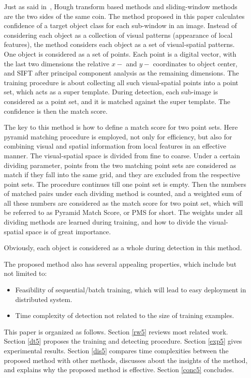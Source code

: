\documentclass[paper]{ieice}
\begin{document}
 Just as said in~\cite{ac27}, Hough transform based methods and sliding-window methods are the two sides of the same coin. The method proposed in this paper calculates confidence of a target object class for each sub-window in an image. Instead of considering each object as a collection of visual patterns (appearance of local features), the method considers each object as a set of visual-spatial patterns. One object is considered as a set of points. Each point is a digital vector, with the last two dimensions the relative $x-$ and $y-$ coordinates to object center, and SIFT after principal component analysis as the remaining dimensions. The training procedure is about collecting all such visual-spatial points into a point set, which acts as a super template. During detection, each sub-image is considered as a point set, and it is matched against the super template. The confidence is then the match score.

 The key to this method is how to define a match score for two point sets. Here pyramid matching procedure is employed, not only for efficiency, but also for combining visual and spatial information from local features in an effective manner. The visual-spatial space is divided from fine to coarse. Under a certain dividing parameter, points from the two matching point sets are considered as match if they fall into the same grid, and they are excluded from the respective point sets. The procedure continues till one point set is empty. Then the numbers of matched pairs under each dividing method is counted, and a weighted sum of all these numbers are considered as the match score for two point set, which will be referred to as Pyramid Match Score, or PMS for short. The weights under all dividing methods are learned during training, and how to divide the visual-spatial space is of great importance.

Obviously, each object is considered as a whole during detection in this method.

The proposed method also has several appealing properties, which include but not limited to:
\begin{itemize}
\item {Feasibility of sequential/batch training, which will lead to easy deployment in distributed system.}
\item {Time complexity of detection not related to the size of training examples.}
\end{itemize}



This paper is organized as follows. Section \ref{rw5} reviews most related work. Section \ref{dt5} proposes the training and detecting procedure. Section \ref{exp5} gives experimental results. Section \ref{dis5} compares time complexities between the proposed method with other methods, discusses about the insights of the method, and explains why the proposed method is effective. Section \ref{conc5} concludes.
\end{document}
